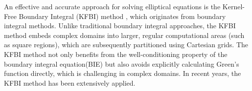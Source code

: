 An effective and accurate approach for solving elliptical equations is the Kernel-Free Boundary Integral (KFBI) method \cite{ying2007kernel, ying2013kernel, ying2014kernel}, which originates from boundary integral methods. Unlike traditional boundary integral approaches, the KFBI method embeds complex domains into larger, regular computational areas (such as square regions), which are subsequently partitioned using Cartesian grids. The KFBI method not only benefits from the well-conditioning property of the boundary integral equation(BIE) but also avoids explicitly calculating Green's function directly, which is challenging in complex domains\cite{xie2019fourth,ying2013kernel}.
In recent years, the KFBI method has been extensively applied\cite{xie2019fourth,xie2021cartesian,ZHAO2023116163,dong2023kernelfree,zhou2023adi}.

